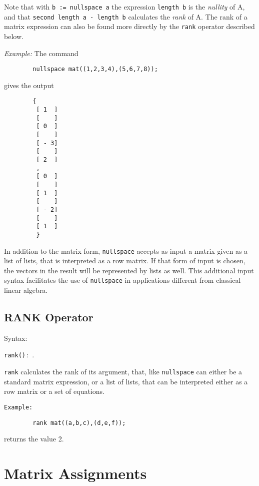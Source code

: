 Note that with \texttt{b := nullspace a} the expression \texttt{length b} is
the \emph{nullity} of A, and that \texttt{second length a - length b}
calculates the \emph{rank} of A.  The rank of a matrix expression can also
be found more directly by the \texttt{rank} operator described below.

\textit{Example:} The command
\begin{verbatim}
        nullspace mat((1,2,3,4),(5,6,7,8));
\end{verbatim}
   gives the output

\begin{verbatim}
        {
         [ 1  ]
         [    ]
         [ 0  ]
         [    ]
         [ - 3]
         [    ]
         [ 2  ]
         ,
         [ 0  ]
         [    ]
         [ 1  ]
         [    ]
         [ - 2]
         [    ]
         [ 1  ]
         }
\end{verbatim}

In addition to the {\REDUCE} matrix form, \texttt{nullspace} accepts as input a
matrix given as a list of lists, that is interpreted as a row matrix.  If
that form of input is chosen, the vectors in the result will be
represented by lists as well.  This additional input syntax facilitates
the use of \texttt{nullspace} in applications different from classical linear
algebra.

\subsection{RANK Operator}
\hypertarget{operator:RANK}{}

Syntax:
\begin{syntax}
        \texttt{rank(}\texttt{)}\,:\, .
\end{syntax}
\texttt{rank} calculates the rank of its argument, that, like \texttt{nullspace}
can either be a standard matrix expression, or a list of lists, that can
be interpreted either as a row matrix or a set of equations.

\texttt{Example:}
\begin{verbatim}
        rank mat((a,b,c),(d,e,f));
\end{verbatim}
returns the value 2.

\section{Matrix Assignments} 


